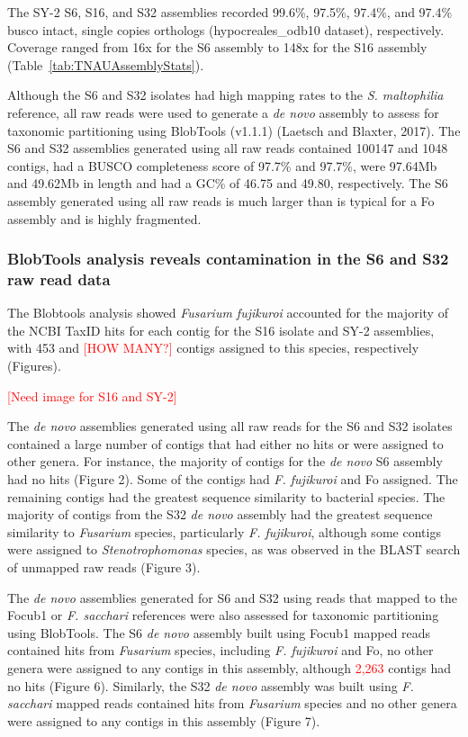 The SY-2 S6, S16, and S32 assemblies recorded 99.6\%, 97.5\%, 97.4\%, and 97.4\% \ac{busco} intact, single copies orthologs (hypocreales\_odb10 dataset), respectively. Coverage ranged from 16x for the S6 assembly to 148x for the S16 assembly (Table~\ref{tab:TNAUAssemblyStats}).

\bigskip

\bigskip

Although the S6 and S32 isolates had high mapping rates to the \textit{S. maltophilia} reference, all raw reads were used to generate a \textit{de novo} assembly to assess for taxonomic partitioning using BlobTools (v1.1.1) (Laetsch and Blaxter, 2017). The S6 and S32 assemblies generated using all raw reads contained 100147 and 1048 contigs, had a BUSCO completeness score of 97.7\% and 97.7\%, were 97.64Mb and 49.62Mb in length and had a GC\% of 46.75 and 49.80, respectively. The S6 assembly generated using all raw reads is much larger than is typical for a \ac{Fo} assembly and is highly fragmented. 

\subsubsection{BlobTools analysis reveals contamination in the S6 and S32 raw read data}

The Blobtools analysis showed \textit{Fusarium fujikuroi} accounted for the majority of the NCBI TaxID hits for each contig for the S16 isolate and SY-2 assemblies, with 453 and \textcolor{red}{[HOW MANY?]} contigs assigned to this species, respectively (Figures). 

\textcolor{red}{[Need image for S16 and SY-2]}

The \textit{de novo} assemblies generated using all raw reads for the S6 and S32 isolates contained a large number of contigs that had either no hits or were assigned to other genera. For instance, the majority of contigs for the \textit{de novo} S6 assembly had no hits (Figure 2). Some of the contigs had \textit{F. fujikuroi} and \ac{Fo} assigned. The remaining contigs had the greatest sequence similarity to bacterial species. The majority of contigs from the S32 \textit{de novo} assembly had the greatest sequence similarity to \textit{Fusarium} species, particularly \textit{F. fujikuroi}, although some contigs were assigned to \textit{Stenotrophomonas} species, as was observed in the BLAST search of unmapped raw reads (Figure 3). 

The \textit{de novo} assemblies generated for S6 and S32 using reads that mapped to the \ac{Focub1} or \textit{F. sacchari} references were also assessed for taxonomic partitioning using BlobTools. The S6 \textit{de novo} assembly built using \ac{Focub1} mapped reads contained hits from \textit{Fusarium} species, including \textit{F. fujikuroi} and \ac{Fo}, no other genera were assigned to any contigs in this assembly, although \textcolor{red}{2,263} contigs had no hits (Figure 6).  Similarly, the S32 \textit{de novo} assembly was built using \textit{F. sacchari} mapped reads contained hits from \textit{Fusarium} species and no other genera were assigned to any contigs in this assembly (Figure 7). 
 

